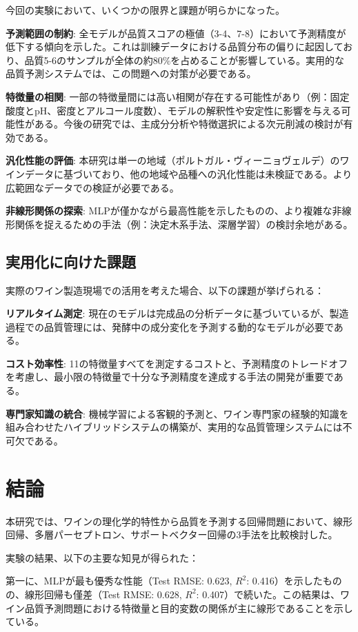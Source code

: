 \documentclass[12pt,a4paper,dvipdfmx]{jsarticle}
\begin{document}
今回の実験において、いくつかの限界と課題が明らかになった。

\textbf{予測範囲の制約}: 全モデルが品質スコアの極値（3-4、7-8）において予測精度が低下する傾向を示した。これは訓練データにおける品質分布の偏りに起因しており、品質5-6のサンプルが全体の約80\%を占めることが影響している。実用的な品質予測システムでは、この問題への対策が必要である。

\textbf{特徴量の相関}: 一部の特徴量間には高い相関が存在する可能性があり（例：固定酸度とpH、密度とアルコール度数）、モデルの解釈性や安定性に影響を与える可能性がある。今後の研究では、主成分分析や特徴選択による次元削減の検討が有効である。

\textbf{汎化性能の評価}: 本研究は単一の地域（ポルトガル・ヴィーニョヴェルデ）のワインデータに基づいており、他の地域や品種への汎化性能は未検証である。より広範囲なデータでの検証が必要である。

\textbf{非線形関係の探索}: MLPが僅かながら最高性能を示したものの、より複雑な非線形関係を捉えるための手法（例：決定木系手法、深層学習）の検討余地がある。

\subsection{実用化に向けた課題}

実際のワイン製造現場での活用を考えた場合、以下の課題が挙げられる：

\textbf{リアルタイム測定}: 現在のモデルは完成品の分析データに基づいているが、製造過程での品質管理には、発酵中の成分変化を予測する動的なモデルが必要である。

\textbf{コスト効率性}: 11の特徴量すべてを測定するコストと、予測精度のトレードオフを考慮し、最小限の特徴量で十分な予測精度を達成する手法の開発が重要である。

\textbf{専門家知識の統合}: 機械学習による客観的予測と、ワイン専門家の経験的知識を組み合わせたハイブリッドシステムの構築が、実用的な品質管理システムには不可欠である。

\section{結論}

本研究では、ワインの理化学的特性から品質を予測する回帰問題において、線形回帰、多層パーセプトロン、サポートベクター回帰の3手法を比較検討した。

実験の結果、以下の主要な知見が得られた：

第一に、MLPが最も優秀な性能（Test RMSE: 0.623, $R^2$: 0.416）を示したものの、線形回帰も僅差（Test RMSE: 0.628, $R^2$: 0.407）で続いた。この結果は、ワイン品質予測問題における特徴量と目的変数の関係が主に線形であることを示している。
\end{document}
